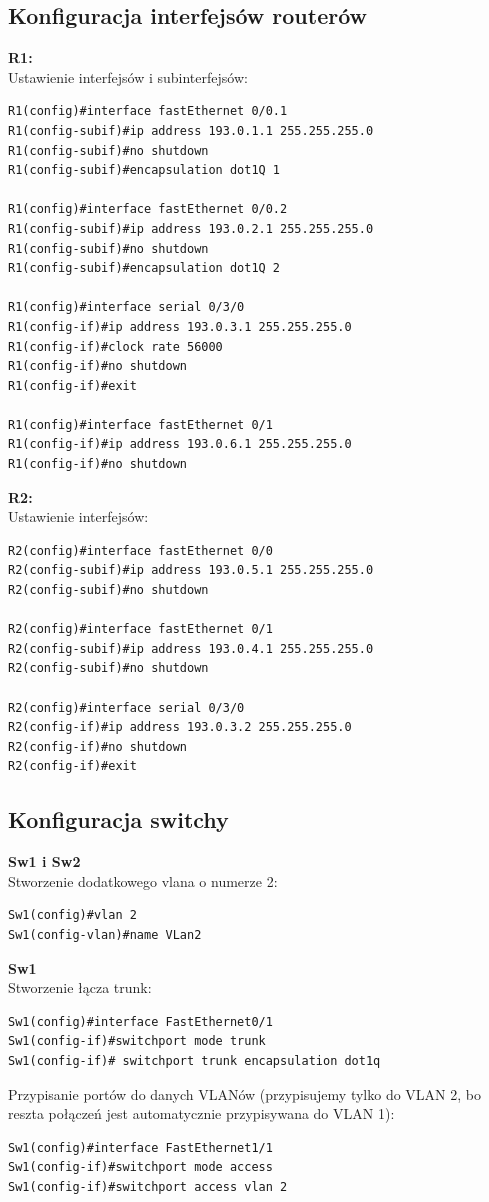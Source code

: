 \documentclass[11pt,a4paper]{article}
\begin{document}
\subsection{Konfiguracja interfejsów routerów}
{\bf R1:}\\
\noindent
Ustawienie interfejsów i subinterfejsów:
\begin{lstlisting}
R1(config)#interface fastEthernet 0/0.1
R1(config-subif)#ip address 193.0.1.1 255.255.255.0
R1(config-subif)#no shutdown
R1(config-subif)#encapsulation dot1Q 1

R1(config)#interface fastEthernet 0/0.2
R1(config-subif)#ip address 193.0.2.1 255.255.255.0
R1(config-subif)#no shutdown
R1(config-subif)#encapsulation dot1Q 2

R1(config)#interface serial 0/3/0
R1(config-if)#ip address 193.0.3.1 255.255.255.0
R1(config-if)#clock rate 56000
R1(config-if)#no shutdown 
R1(config-if)#exit

R1(config)#interface fastEthernet 0/1
R1(config-if)#ip address 193.0.6.1 255.255.255.0
R1(config-if)#no shutdown
\end{lstlisting}

\noindent
{\bf R2:}\\
Ustawienie interfejsów:
\begin{lstlisting}
R2(config)#interface fastEthernet 0/0
R2(config-subif)#ip address 193.0.5.1 255.255.255.0
R2(config-subif)#no shutdown

R2(config)#interface fastEthernet 0/1
R2(config-subif)#ip address 193.0.4.1 255.255.255.0
R2(config-subif)#no shutdown

R2(config)#interface serial 0/3/0
R2(config-if)#ip address 193.0.3.2 255.255.255.0
R2(config-if)#no shutdown 
R2(config-if)#exit
\end{lstlisting}

\subsection{Konfiguracja switchy}
{\bf Sw1 i Sw2}\\
Stworzenie dodatkowego vlana o numerze 2:
\begin{lstlisting}
Sw1(config)#vlan 2
Sw1(config-vlan)#name VLan2
\end{lstlisting}
\noindent
{\bf Sw1}\\
Stworzenie łącza trunk:
\begin{lstlisting}
Sw1(config)#interface FastEthernet0/1
Sw1(config-if)#switchport mode trunk
Sw1(config-if)# switchport trunk encapsulation dot1q
\end{lstlisting}
Przypisanie portów do danych VLANów (przypisujemy tylko do VLAN 2, bo reszta połączeń jest automatycznie przypisywana do VLAN 1):
\begin{lstlisting}
Sw1(config)#interface FastEthernet1/1
Sw1(config-if)#switchport mode access
Sw1(config-if)#switchport access vlan 2
\end{lstlisting}
\end{document}
